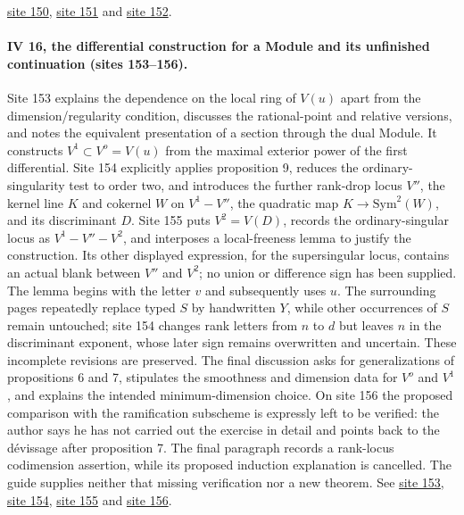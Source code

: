\href{https://grothendieck.umontpellier.fr/web/viewer.html?file=../25.pdf#page=151}{site 150}, \href{https://grothendieck.umontpellier.fr/web/viewer.html?file=../25.pdf#page=152}{site 151} and \href{https://grothendieck.umontpellier.fr/web/viewer.html?file=../25.pdf#page=153}{site 152}.

\paragraph{IV 16, the differential construction for a Module and its unfinished continuation (sites 153--156).}
Site 153 explains the dependence on the local ring of $V(u)$ apart from the dimension/regularity condition, discusses the rational-point and relative versions, and notes the equivalent presentation of a section through the dual Module. It constructs $V^1\subset V^o=V(u)$ from the maximal exterior power of the first differential. Site 154 explicitly applies proposition 9, reduces the ordinary-singularity test to order two, and introduces the further rank-drop locus $V''$, the kernel line $K$ and cokernel $W$ on $V^1-V''$, the quadratic map $K\longrightarrow\mathrm{Sym}^2(W)$, and its discriminant $D$. Site 155 puts $V^2=V(D)$, records the ordinary-singular locus as $V^1-V''-V^2$, and interposes a local-freeness lemma to justify the construction. Its other displayed expression, for the supersingular locus, contains an actual blank between $V''$ and $V^2$; no union or difference sign has been supplied. The lemma begins with the letter $v$ and subsequently uses $u$. The surrounding pages repeatedly replace typed $S$ by handwritten $Y$, while other occurrences of $S$ remain untouched; site 154 changes rank letters from $n$ to $d$ but leaves $n$ in the discriminant exponent, whose later sign remains overwritten and uncertain. These incomplete revisions are preserved. The final discussion asks for generalizations of propositions 6 and 7, stipulates the smoothness and dimension data for $V^o$ and $V^1$, and explains the intended minimum-dimension choice. On site 156 the proposed comparison with the ramification subscheme is expressly left to be verified: the author says he has not carried out the exercise in detail and points back to the dévissage after proposition 7. The final paragraph records a rank-locus codimension assertion, while its proposed induction explanation is cancelled. The guide supplies neither that missing verification nor a new theorem. See \href{https://grothendieck.umontpellier.fr/web/viewer.html?file=../25.pdf#page=154}{site 153}, \href{https://grothendieck.umontpellier.fr/web/viewer.html?file=../25.pdf#page=155}{site 154}, \href{https://grothendieck.umontpellier.fr/web/viewer.html?file=../25.pdf#page=156}{site 155} and \href{https://grothendieck.umontpellier.fr/web/viewer.html?file=../25.pdf#page=157}{site 156}.
